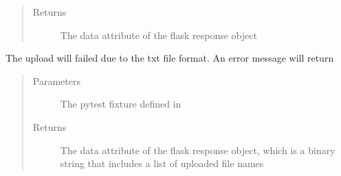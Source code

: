 \documentclass[letterpaper,10pt,english]{sphinxmanual}
\begin{document}
\begin{fulllineitems}
\begin{fulllineitems}
\begin{quote}
\begin{description}
\item[{Returns}] \leavevmode
The data attribute of the flask response object

\end{description}\end{quote}

\end{fulllineitems}


\begin{fulllineitems}
\label{\detokenize{tests:tests.test_cloudmesh.TestFileOperations.pytestmark}}
\end{fulllineitems}


\begin{fulllineitems}
\label{\detokenize{tests:tests.test_cloudmesh.TestFileOperations.test_format_error}}
The upload will failed due to the txt file format. An error message will return
\begin{quote}\begin{description}
\item[{Parameters}] \leavevmode
{} \textendash{} The pytest fixture defined in {\hyperref[\detokenize{tests:module-tests.conftest}]{}}

\item[{Returns}] \leavevmode
The data attribute of the flask response object, which is a binary string that includes a list of uploaded
file names

\end{description}\end{quote}

\end{fulllineitems}



\end{fulllineitems}
\end{document}
